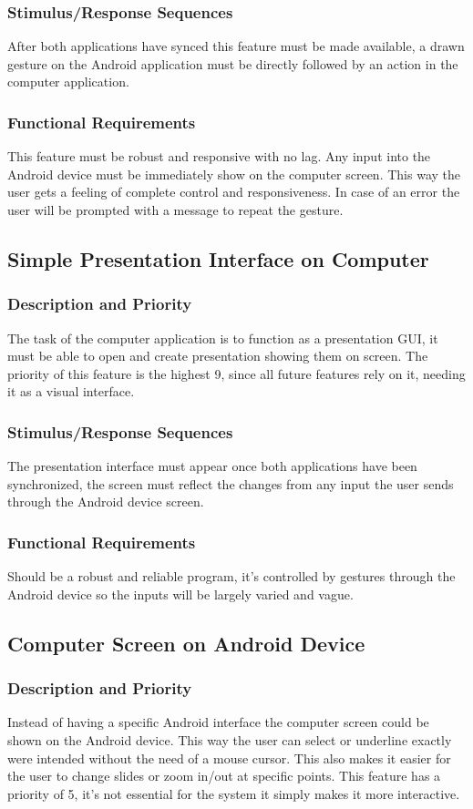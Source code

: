 \documentclass{article}
\begin{document}
\subsubsection{Stimulus/Response Sequences}
After both applications have synced this feature must be made available, a drawn gesture on the Android application must be directly followed by an action in the computer application.
\subsubsection{Functional Requirements}
This feature must be robust and responsive with no lag. Any input into the Android device must be immediately show on the computer screen. This way the user gets a feeling of complete control and responsiveness. In case of an error the user will be prompted with a message to repeat the gesture.
\subsection{Simple Presentation Interface on Computer}
\subsubsection{Description and Priority}
The task of the computer application is to function as a presentation GUI, it must be able to open and create presentation showing them on screen. The priority of this feature is the highest 9, since all future features rely on it, needing it as a visual interface.
\subsubsection{Stimulus/Response Sequences}
The presentation interface must appear once both applications have been synchronized, the screen must reflect the changes from any input the user sends through the Android device screen.
\subsubsection{Functional Requirements}
Should be a robust and reliable program, it's controlled by gestures through the Android device so the inputs will be largely varied and vague.
\subsection{Computer Screen on Android Device}
\subsubsection{Description and Priority}
Instead of having a specific Android interface the computer screen could be shown on the Android device. This way the user can select or underline exactly were intended without the need of a mouse cursor. This also makes it easier for the user to change slides or zoom in/out at specific points. This feature has a priority of 5, it's not essential for the system it simply makes it more interactive. 
\end{document}
